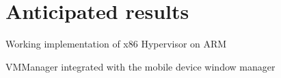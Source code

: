 \section{Anticipated results}
	\begin{itemize*}
	\item Working implementation of x86 Hypervisor on ARM
	\item VMManager integrated with the mobile device window manager 
	\end{itemize*}
